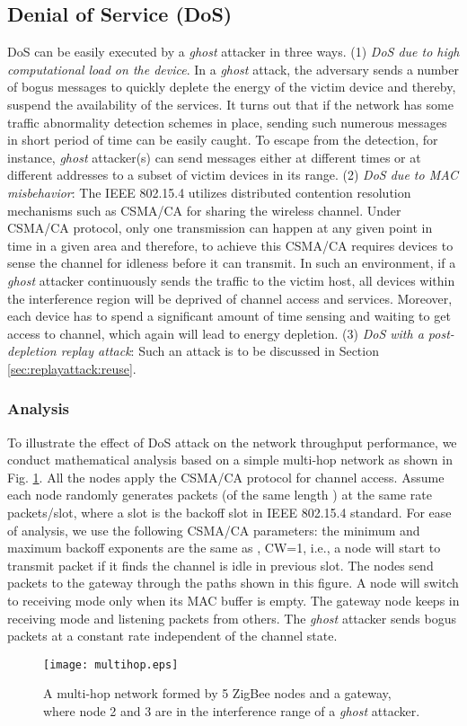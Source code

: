 \documentclass[10pt,journal,cspaper,compsoc]{IEEEtran}
\begin{document}
\subsection{Denial of Service (DoS)}\label{sec:dos}
DoS can be easily executed by a {\em ghost} attacker in three ways. (1) {\em DoS due to high computational load on the device}. In a {\em ghost} attack, the adversary sends a number of bogus messages  to quickly deplete the energy of the victim device and thereby, suspend the availability of the services. It turns out that if the network has some  traffic abnormality detection schemes in place, sending such numerous messages in short period of time can be easily caught. To escape from the detection, for instance, {\em ghost} attacker(s) can send messages either at different times or at different addresses to a subset of victim devices in its range. (2) {\em DoS due to MAC misbehavior}: The IEEE 802.15.4 utilizes distributed contention resolution mechanisms such as CSMA/CA for sharing the wireless channel. Under CSMA/CA protocol, only one transmission can happen at any given point in time in a given area and therefore, to achieve this CSMA/CA requires devices to sense the channel for idleness before it can transmit. In such an environment,  if a {\em ghost} attacker continuously sends the traffic to the victim host, all devices within the interference region will be deprived of channel access and services. Moreover, each device has to spend a significant amount of time sensing and waiting to get access to channel, which again will lead to energy depletion. (3) {\em DoS with a post-depletion replay attack}: Such an attack is to be discussed in Section \ref{sec:replayattack:reuse}.

\subsubsection{Analysis}\label{sec:dos:analysis}
To illustrate the effect of DoS attack on the network throughput performance, we conduct mathematical analysis based on a simple multi-hop network as shown in Fig. \ref{fig_multihop}. All the nodes apply the CSMA/CA protocol for channel access. Assume each node randomly generates packets (of the same length ) at the same rate  packets/slot, where a slot is the backoff slot in IEEE 802.15.4 standard. For ease of analysis, we use the following CSMA/CA parameters: the minimum and maximum backoff exponents are the same as , CW=1, i.e., a node will start to transmit packet if it finds the channel is idle in previous slot. The nodes send packets to the gateway through the paths shown in this figure. A node will switch to receiving mode only when its MAC buffer is empty. The gateway node keeps in receiving mode and listening packets from others. The {\em ghost} attacker sends bogus packets at a constant rate  independent of the channel state.
\begin{figure}[htbp]
    \centering
    \texttt{[image: multihop.eps]}
    \caption{A multi-hop network formed by 5 ZigBee nodes and a gateway, where node 2 and 3 are in the interference range of a {\em ghost} attacker.}
    \label{fig_multihop}
\vspace{-3mm}
\end{figure}
\end{document}

